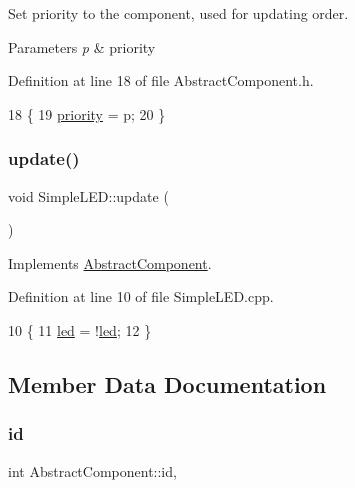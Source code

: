 Set priority to the component, used for updating order. 


\begin{DoxyParams}{Parameters}
{\em p} & priority \\
\hline
\end{DoxyParams}


Definition at line 18 of file Abstract\+Component.\+h.


\begin{DoxyCode}
18                             \{
19         \hyperlink{class_abstract_component_aff57dfa5f31be093a06b55560e33fb95}{priority} = p;
20     \}
\end{DoxyCode}
\mbox{\label{class_simple_l_e_d_a1642dc4aca42ad46e5663a39cdda005f}} 
\subsubsection{\texorpdfstring{update()}{update()}}
{\footnotesize\ttfamily void Simple\+L\+E\+D\+::update (\begin{DoxyParamCaption}{ }\end{DoxyParamCaption})\hspace{0.3cm}{\ttfamily [virtual]}}



Implements \hyperlink{class_abstract_component_af25a90b8ab213762221c3b358d9873f3}{Abstract\+Component}.



Definition at line 10 of file Simple\+L\+E\+D.\+cpp.


\begin{DoxyCode}
10                        \{
11     \hyperlink{class_simple_l_e_d_ae16514a63d8a19ab12e9adb19bba086d}{led} = !\hyperlink{class_simple_l_e_d_ae16514a63d8a19ab12e9adb19bba086d}{led};
12 \}
\end{DoxyCode}


\subsection{Member Data Documentation}
\mbox{\label{class_abstract_component_a9c9c548149681b1a1dd935e66ed5dd11}} 
\subsubsection{\texorpdfstring{id}{id}}
{\footnotesize\ttfamily int Abstract\+Component\+::id\hspace{0.3cm}{\ttfamily [protected]}, {\ttfamily [inherited]}}



